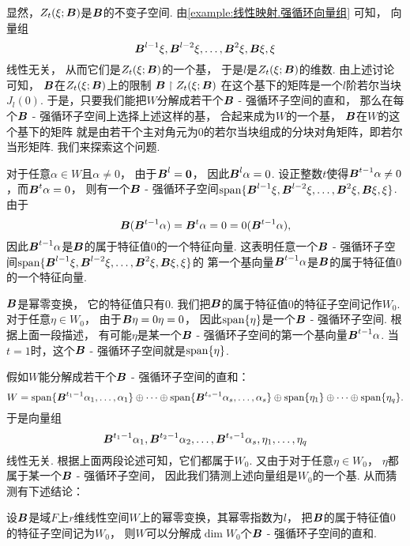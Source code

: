 显然，\(Z_t(\xi;\boldsymbol{B})\)是\(\boldsymbol{B}\)的不变子空间.
由\cref{example:线性映射.强循环向量组} 可知，
向量组\begin{equation*}
	\boldsymbol{B}^{l-1}\xi,\boldsymbol{B}^{l-2}\xi,\dotsc,\boldsymbol{B}^2\xi,\boldsymbol{B}\xi,\xi
\end{equation*}线性无关，
从而它们是\(Z_t(\xi;\boldsymbol{B})\)的一个基，
于是\(l\)是\(Z_t(\xi;\boldsymbol{B})\)的维数.
由上述讨论可知，
\(\boldsymbol{B}\)在\(Z_t(\xi;\boldsymbol{B})\)上的限制
\(\boldsymbol{B} \upharpoonright Z_t(\xi;\boldsymbol{B})\)
在这个基下的矩阵是一个\(l\)阶若尔当块\(J_l(0)\).
于是，只要我们能把\(W\)分解成若干个\(\boldsymbol{B}\) - 强循环子空间的直和，
那么在每个\(\boldsymbol{B}\) - 强循环子空间上选择上述这样的基，
合起来成为\(W\)的一个基，
\(\boldsymbol{B}\)在\(W\)的这个基下的矩阵
就是由若干个主对角元为\(0\)的若尔当块组成的分块对角矩阵，即若尔当形矩阵.
我们来探索这个问题.

对于任意\(\alpha \in W\)且\(\alpha\neq0\)，
由于\(\boldsymbol{B}^l=\boldsymbol0\)，
因此\(\boldsymbol{B}^l\alpha=0\).
设正整数\(t\)使得\(\boldsymbol{B}^{t-1}\alpha\neq0\)，而\(\boldsymbol{B}^t\alpha=0\)，
则有一个\(\boldsymbol{B}\) - 强循环子空间\(\operatorname{span}\{\boldsymbol{B}^{l-1}\xi,\boldsymbol{B}^{l-2}\xi,\dotsc,\boldsymbol{B}^2\xi,\boldsymbol{B}\xi,\xi\}\).
由于\begin{equation*}
	\boldsymbol{B}(\boldsymbol{B}^{t-1}\alpha)
	= \boldsymbol{B}^t\alpha
	= 0
	= 0(\boldsymbol{B}^{t-1}\alpha),
\end{equation*}
因此\(\boldsymbol{B}^{t-1}\alpha\)是\(\boldsymbol{B}\)的属于特征值\(0\)的一个特征向量.
这表明任意一个\(\boldsymbol{B}\) - 强循环子空间\(\operatorname{span}\{\boldsymbol{B}^{l-1}\xi,\boldsymbol{B}^{l-2}\xi,\dotsc,\boldsymbol{B}^2\xi,\boldsymbol{B}\xi,\xi\}\)的
第一个基向量\(\boldsymbol{B}^{t-1}\alpha\)是\(\boldsymbol{B}\)的属于特征值\(0\)的一个特征向量.

\(\boldsymbol{B}\)是幂零变换，
它的特征值只有\(0\).
我们把\(\boldsymbol{B}\)的属于特征值\(0\)的特征子空间记作\(W_0\).
对于任意\(\eta \in W_0\)，
由于\(\boldsymbol{B}\eta = 0\eta = 0\)，
因此\(\operatorname{span}\{\eta\}\)是一个\(\boldsymbol{B}\) - 强循环子空间.
根据上面一段描述，
有可能\(\eta\)是某一个\(\boldsymbol{B}\) - 强循环子空间的第一个基向量\(\boldsymbol{B}^{t-1}\alpha\).
当\(t=1\)时，这个\(\boldsymbol{B}\) - 强循环子空间就是\(\operatorname{span}\{\eta\}\).

假如\(W\)能分解成若干个\(\boldsymbol{B}\) - 强循环子空间的直和：\begin{equation*}
	W = \operatorname{span}\{\boldsymbol{B}^{t_1-1}\alpha_1,\dotsc,\alpha_1\}
		\oplus \dotsb
		\oplus \operatorname{span}\{\boldsymbol{B}^{t_s-1}\alpha_s,\dotsc,\alpha_s\}
		\oplus \operatorname{span}\{\eta_1\}
		\oplus \dotsb
		\oplus \operatorname{span}\{\eta_q\}.
\end{equation*}
于是向量组\begin{equation*}
	\boldsymbol{B}^{t_1-1}\alpha_1,
	\boldsymbol{B}^{t_2-1}\alpha_2,
	\dotsc,
	\boldsymbol{B}^{t_s-1}\alpha_s,
	\eta_1,
	\dotsc,
	\eta_q
\end{equation*}线性无关.
根据上面两段论述可知，它们都属于\(W_0\).
又由于对于任意\(\eta \in W_0\)，
\(\eta\)都属于某一个\(\boldsymbol{B}\) - 强循环子空间，
因此我们猜测上述向量组是\(W_0\)的一个基.
从而猜测有下述结论：
\begin{theorem}
设\(\boldsymbol{B}\)是域\(F\)上\(r\)维线性空间\(W\)上的幂零变换，其幂零指数为\(l\)，
把\(\boldsymbol{B}\)的属于特征值\(0\)的特征子空间记为\(W_0\)，
则\(W\)可以分解成\(\dim W_0\)个\(\boldsymbol{B}\) - 强循环子空间的直和.
\end{theorem}

